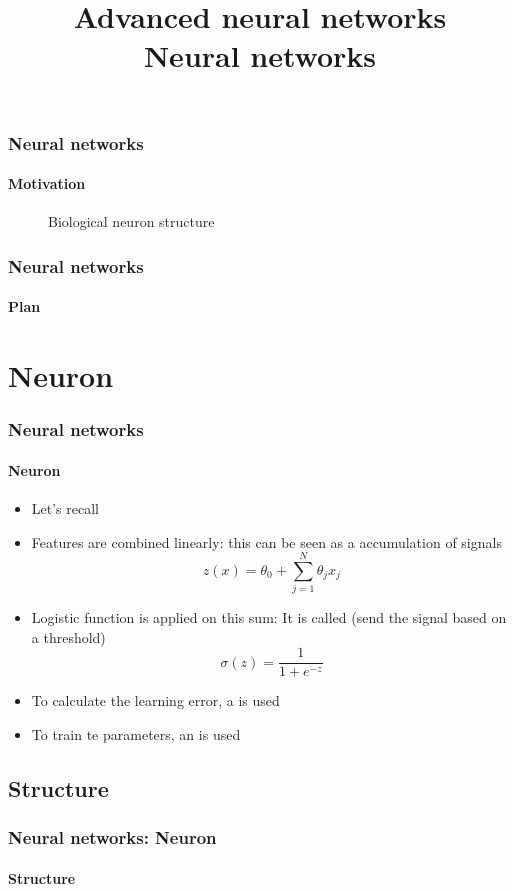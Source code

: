 \documentclass[xcolor=table]{beamer}
\title[ANN: Neural networks] %
{Advanced neural networks\\Neural networks}
\begin{document}
\begin{frame}
\frametitle{Neural networks}
\framesubtitle{Motivation}

\begin{figure}
	\centering
	\caption{Biological neuron structure \cite{2017-cain}}
\end{figure}

\end{frame}

\begin{frame}
\frametitle{Neural networks}
\framesubtitle{Plan}

\begin{multicols}{2}
	\tableofcontents
\end{multicols}
\end{frame}

\section{Neuron}

\begin{frame}
\frametitle{Neural networks}
\framesubtitle{Neuron}

\begin{itemize}
	\item Let's recall 
	\item Features are combined linearly: this can be seen as a accumulation of signals
	\[z(x) = \theta_0 + \sum\limits_{j=1}^{N} \theta_j x_j\]
	\item Logistic function is applied on this sum: It is called  (send the signal based on a threshold) 
	\[\sigma(z) = \frac{1}{1 + e^{-z}}\] 
	\item To calculate the learning error, a  is used
	\item To train te parameters, an  is used
\end{itemize}

\end{frame}

\subsection{Structure}

\begin{frame}
\frametitle{Neural networks: Neuron}
\framesubtitle{Structure}


\end{frame}
\end{document}
